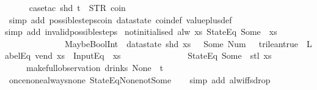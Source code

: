 \begin{isabellebody}
\ \ \ \ \isamarkupfalse%
\ {\isacharparenleft}case{\isacharunderscore}tac\ {\isachardoublequoteopen}shd\ t\ {\isacharequal}\ {\isacharparenleft}STR\ {\isacharprime}{\isacharprime}coin{\isacharprime}{\isacharprime}{\isacharcomma}\ {\isacharbrackleft}{\isacharbrackright}{\isacharparenright}{\isachardoublequoteclose}{\isacharparenright}\isanewline
\ \ \ \isamarkupfalse%
\ {\isacharparenleft}simp\ add{\isacharcolon}\ possible{\isacharunderscore}steps{\isacharunderscore}coin\ datastate\ coin{\isacharunderscore}def\ value{\isacharunderscore}plus{\isacharunderscore}def{\isacharparenright}\isanewline
\ \ \isamarkupfalse%
{\isacharparenleft}simp\ add{\isacharcolon}\ invalid{\isacharunderscore}possible{\isacharunderscore}steps{\isacharunderscore}{}{\isacharparenright}%
\endisatagproof
{\isafoldproof}%
%
\isadelimproof
\isanewline
%
\endisadelimproof
\isanewline
{}\isamarkupfalse%
\ not{\isacharunderscore}initialised{\isacharcolon}\ {\isachardoublequoteopen}alw\ {\isacharparenleft}{\isasymlambda}xs{\isachardot}\ StateEq\ {\isacharparenleft}Some\ {}{\isacharparenright}\ xs\ {\isasymand}\isanewline
\ \ \ \ \ \ \ \ \ \ \ \ \ \ MaybeBoolInt\ {\isacharparenleft}{\isacharless}{\isacharparenright}\ {\isacharparenleft}datastate\ {\isacharparenleft}shd\ xs{\isacharparenright}\ {\isachardollar}\ {\isacharparenleft}{}{\isacharparenright}{\isacharparenright}\ {\isacharparenleft}Some\ {\isacharparenleft}Num\ {}{\isacharparenright}{\isacharparenright}\ {\isacharequal}\ trilean{\isachardot}true\ {\isasymand}\ LabelEq\ {\isacharprime}{\isacharprime}vend{\isacharprime}{\isacharprime}\ xs\ {\isasymand}\ InputEq\ {\isacharbrackleft}{\isacharbrackright}\ xs\ {\isasymlongrightarrow}\isanewline
\ \ \ \ \ \ \ \ \ \ \ \ \ \ StateEq\ {\isacharparenleft}Some\ {}{\isacharparenright}\ {\isacharparenleft}stl\ xs{\isacharparenright}{\isacharparenright}\isanewline
\ \ \ \ \ {\isacharparenleft}make{\isacharunderscore}full{\isacharunderscore}observation\ drinks\ None\ {\isacharless}{\isachargreater}\ t{\isacharparenright}{\isachardoublequoteclose}\isanewline
%
\isadelimproof
\ \ %
\endisadelimproof
%
\isatagproof
{}\isamarkupfalse%
\ once{\isacharunderscore}none{\isacharunderscore}always{\isacharunderscore}none\ StateEq{\isacharunderscore}None{\isacharunderscore}not{\isacharunderscore}Some\isanewline
\ \ \isamarkupfalse%
\ {\isacharparenleft}simp\ add{\isacharcolon}\ alw{\isacharunderscore}iff{\isacharunderscore}sdrop{\isacharparenright}%
\endisatagproof

\end{isabellebody}
